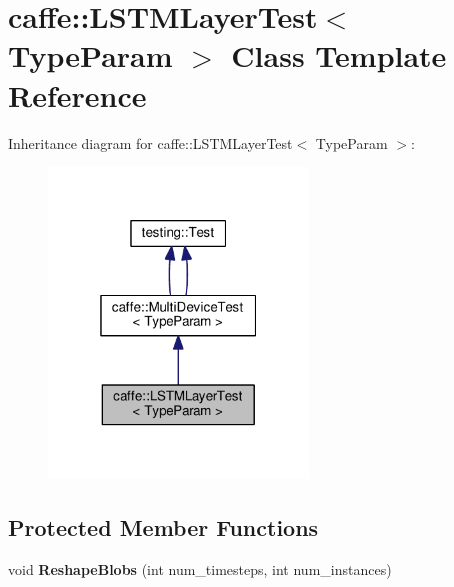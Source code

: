 \hypertarget{classcaffe_1_1_l_s_t_m_layer_test}{}\section{caffe\+:\+:L\+S\+T\+M\+Layer\+Test$<$ Type\+Param $>$ Class Template Reference}
\label{classcaffe_1_1_l_s_t_m_layer_test}


Inheritance diagram for caffe\+:\+:L\+S\+T\+M\+Layer\+Test$<$ Type\+Param $>$\+:
\nopagebreak
\begin{figure}[H]
\begin{center}
\leavevmode
\includegraphics[width=196pt]{classcaffe_1_1_l_s_t_m_layer_test__inherit__graph}
\end{center}
\end{figure}
\subsection*{Protected Member Functions}
\begin{DoxyCompactItemize}
\item 
\mbox{\label{classcaffe_1_1_l_s_t_m_layer_test_a267821e5c6cea6c23c01d5537a13d6df}} 
void {\bfseries Reshape\+Blobs} (int num\+\_\+timesteps, int num\+\_\+instances)
\end{DoxyCompactItemize}
